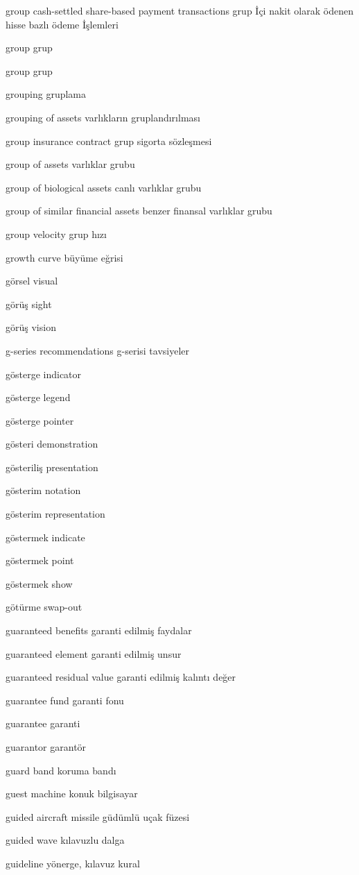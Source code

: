 \documentclass[12pt,fleqn]{article}\usepackage{../../common}
\begin{document}
group cash-settled share-based payment transactions grup İçi nakit olarak ödenen hisse bazlı ödeme İşlemleri

group grup

group grup

grouping gruplama

grouping of assets varlıkların gruplandırılması

group insurance contract grup sigorta sözleşmesi

group of assets varlıklar grubu

group of biological assets canlı varlıklar grubu

group of similar financial assets benzer finansal varlıklar grubu

group velocity grup hızı

growth curve büyüme eğrisi

görsel visual

görüş sight

görüş vision

g-series recommendations g-serisi tavsiyeler

gösterge indicator

gösterge legend

gösterge pointer

gösteri demonstration

gösteriliş presentation

gösterim notation

gösterim representation

göstermek indicate

göstermek point

göstermek show

götürme swap-out

guaranteed benefits garanti edilmiş faydalar

guaranteed element garanti edilmiş unsur

guaranteed residual value garanti edilmiş kalıntı değer

guarantee fund garanti fonu

guarantee garanti

guarantor garantör

guard band koruma bandı

guest machine konuk bilgisayar

guided aircraft missile güdümlü uçak füzesi

guided wave kılavuzlu dalga

guideline yönerge, kılavuz kural
\end{document}
